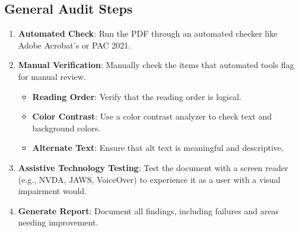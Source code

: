 \subsection{General Audit Steps}
\label{subsec:general-audit-steps}
\begin{enumerate}
	\item \textbf{Automated Check}: Run the PDF through an automated checker like Adobe Acrobat's or PAC 2021.
	\item \textbf{Manual Verification}: Manually check the items that automated tools flag for manual review.
	      \begin{itemize}
		      \item \textbf{Reading Order}: Verify that the reading order is logical.
		      \item \textbf{Color Contrast}: Use a color contrast analyzer to check text and background colors.
		      \item \textbf{Alternate Text}: Ensure that alt text is meaningful and descriptive.
	      \end{itemize}
	\item \textbf{Assistive Technology Testing}: Test the document with a screen reader (e.g., NVDA, JAWS, VoiceOver) to experience it as a user with a visual impairment would.
	\item \textbf{Generate Report}: Document all findings, including failures and areas needing improvement.
\end{enumerate}

